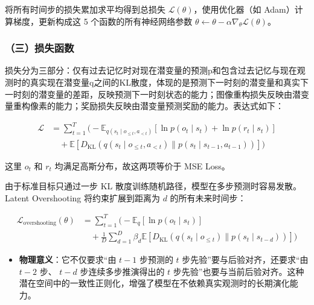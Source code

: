 将所有时间步的损失累加求平均得到总损失 \(\mathcal{L}(\theta)\)，使用优化器（如 Adam）计算梯度，更新构成这 5 个函数的所有神经网络参数 \(\theta \leftarrow \theta - \alpha \nabla_{\theta}\mathcal{L}(\theta)\)。

\hypertarget{ux4e09ux635fux5931ux51fdux6570}{%
\subsubsection{（三）损失函数}\label{ux4e09ux635fux5931ux51fdux6570}}

损失分为三部分：仅有过去记忆时对现在潜变量的预测p和包含过去记忆与现在观测时的真实现在潜变量q之间的KL散度，体现的是预测下一时刻的潜变量和真实下一时刻的潜变量的差距，反映预测下一时刻状态的能力；图像重构损失反映由潜变量重构像素的能力；奖励损失反映由潜变量预测奖励的能力。表达式如下：

\[
\begin{aligned}
\mathcal{L}
&=
\sum_{t=1}^{T}
\Biggl(
-\mathbb{E}_{q(s_t \mid o_{\le t}, a_{<t})}
\left[\ln p(o_t \mid s_t) + \ln p(r_t \mid s_t)\right]
\\
&\quad+
\mathbb{E}
\left[
D_{\mathrm{KL}}\left(
q(s_t \mid o_{\le t}, a_{<t})
\parallel
p(s_t \mid s_{t-1}, a_{t-1})
\right)
\right]
\Biggr)
\end{aligned}
\]

这里 \(o_t\) 和 \(r_t\) 均满足高斯分布，故这两项等价于 MSE Loss。

由于标准目标只通过一步 KL 散度训练随机路径，模型在多步预测时容易发散。Latent Overshooting 将约束扩展到距离为 \(d\) 的所有未来时间步：

\[
\begin{aligned}
\mathcal{L}_{\mathrm{overshooting}}(\theta)
&=
\sum_{t=1}^{T}
\Biggl(
-\mathbb{E}_{q}\left[\ln p(o_t \mid s_t)\right]
\\
&\quad+
\frac{1}{D}
\sum_{d=1}^{D}
\beta_d
\mathbb{E}
\left[
D_{\mathrm{KL}}\left(
q(s_t \mid o_{\le t})
\parallel
p(s_t \mid s_{t-d})
\right)
\right]
\Biggr)
\end{aligned}
\]

\begin{itemize}
\tightlist
\item
  \textbf{物理意义}：它不仅要求``由 \(t - 1\) 步预测的 \(t\) 步先验''要与后验对齐，还要求``由 \(t - 2\) 步、 \(t - d\) 步连续多步推演得出的 \(t\) 步先验''也要与当前后验对齐。这种潜在空间中的一致性正则化，增强了模型在不依赖真实观测时的长期演化能力。
\end{itemize}

